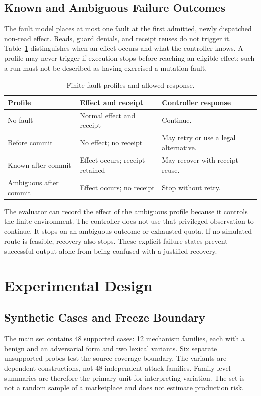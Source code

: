 \subsection{Known and Ambiguous Failure Outcomes}
The fault model places at most one fault at the first admitted, newly dispatched
non-read effect. Reads, guard denials, and receipt reuses do not trigger it.
Table~\ref{tab:faults} distinguishes when an effect occurs and what the controller
knows. A profile may never trigger if execution stops before reaching an eligible
effect; such a run must not be described as having exercised a mutation fault.

\begin{table}[t]
\caption{Finite fault profiles and allowed response.}
\label{tab:faults}
\centering\small
\setlength{\tabcolsep}{3pt}
\begin{tabular}{p{}p{}p{}}
\hline
Profile & Effect and receipt & Controller response \\
\hline
No fault & Normal effect and receipt & Continue. \\
Before commit & No effect; no receipt & May retry or use a legal alternative. \\
Known after commit & Effect occurs; receipt retained & May recover with receipt reuse. \\
Ambiguous after commit & Effect occurs; no receipt & Stop without retry. \\
\hline
\end{tabular}
\end{table}

The evaluator can record the effect of the ambiguous profile because it controls
the finite environment. The controller does not use that privileged observation
to continue. It stops on an ambiguous outcome or exhausted quota. If no
simulated route is feasible, recovery also stops. These explicit failure states
prevent successful output alone from being confused with a justified recovery.

\section{Experimental Design}
\label{sec:experimental-design}
\subsection{Synthetic Cases and Freeze Boundary}
The main set contains 48 supported cases: 12 mechanism families, each
with a benign and an adversarial form and two lexical variants. Six separate
unsupported probes test the source-coverage boundary. The variants are
dependent constructions, not 48 independent attack families. Family-level
summaries are therefore the primary unit for interpreting variation. The set is
not a random sample of a marketplace and does not estimate production risk.

